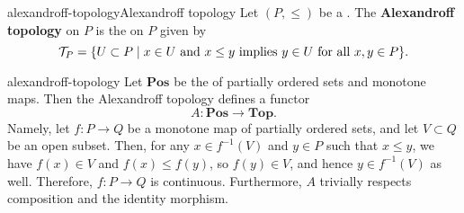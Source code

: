 \begin{topic}{alexandroff-topology}{Alexandroff topology}
    Let $(P, \le)$ be a . The \textbf{Alexandroff topology} on $P$ is the  on $P$ given by
    \[ \mathcal{T}_P = \{ U \subset P \mid x \in U \textup{ and } x \le y \textup{ implies } y \in U \textup{ for all } x, y \in P \} . \]
\end{topic}

\begin{example}{alexandroff-topology}
    Let $\textbf{Pos}$ be the  of partially ordered sets and monotone maps. Then the Alexandroff topology defines a functor
    \[ A : \textbf{Pos} \to \textbf{Top} . \]
    Namely, let $f : P \to Q$ be a monotone map of partially ordered sets, and let $V \subset Q$ be an open subset. Then, for any $x \in f^{-1}(V)$ and $y \in P$ such that $x \le y$, we have $f(x) \in V$ and $f(x) \le f(y)$, so $f(y) \in V$, and hence $y \in f^{-1}(V)$ as well. Therefore, $f : P \to Q$ is continuous. Furthermore, $A$ trivially respects composition and the identity morphism.
\end{example}
